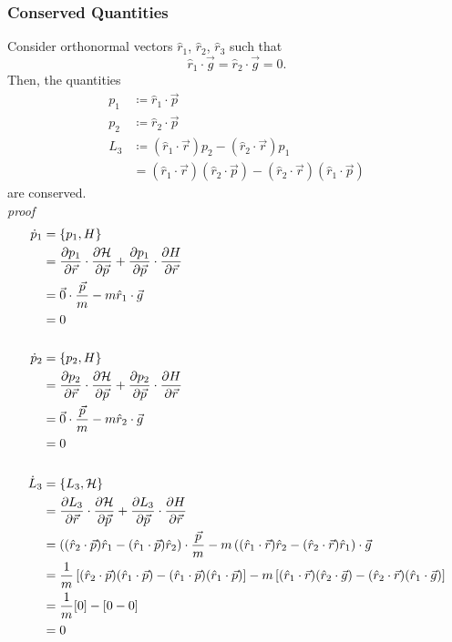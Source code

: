 \documentclass[12pt]{article}
\newcommand{\Ham}{\mathcal{H}}
\newcommand{\pos}{\vec{r}}
\newcommand{\mom}{\vec{p}}
\begin{document}
\subsubsection*{Conserved Quantities}
Consider orthonormal vectors $\hat{r}_1$, $\hat{r}_2$, $\hat{r}_3$ such that
\[ \hat{r}_1 \cdot \vec{g} = \hat{r}_2 \cdot \vec{g} = 0. \]
Then, the quantities
\begin{align*}
    p_1 &\coloneqq \hat{r}_1\cdot\mom \\
    p_2 &\coloneqq \hat{r}_2\cdot\mom \\
    L_3 &\coloneqq (\hat{r}_1\cdot\pos)p_2 - (\hat{r}_2\cdot{\pos})p_1 \\
    &= (\hat{r}_1 \cdot \pos)(\hat{r}_2 \cdot \mom) - (\hat{r}_2 \cdot \pos)(\hat{r}_1 \cdot \mom)
\end{align*}
are conserved. \\ \textit{proof}
\begin{align*}
    \dot{p}_1 &= \pb{p_1}{H} \\
    &= \pdv{p_1}{\pos}\cdot\pdv{\Ham}{\mom} + \pdv{p_1}{\mom}\cdot\pdv{H}{\pos} \\
    &= \vec{0}\cdot\frac{\mom}{m} - m\hat{r}_1\cdot\vec{g} \\
    &= 0 \\
    \\
    \dot{p}_2 &= \pb{p_2}{H} \\
    &= \pdv{p_2}{\pos}\cdot\pdv{\Ham}{\mom} + \pdv{p_2}{\mom}\cdot\pdv{H}{\pos} \\
    &= \vec{0}\cdot\frac{\mom}{m} - m\hat{r}_2\cdot\vec{g} \\
    &= 0 \\
    \\
    \dot{L}_3 &= \pb{L_3}{\Ham} \\
    &= \pdv{L_3}{\pos}\cdot\pdv{\Ham}{\mom} + \pdv{L_3}{\mom}\cdot\pdv{H}{\pos} \\
    &= \left((\hat{r}_2\cdot\mom)\hat{r}_1 - (\hat{r}_1\cdot\mom)\hat{r}_2\right)\cdot \frac{\mom}{m} - m\left((\hat{r}_1\cdot\pos)\hat{r}_2 - (\hat{r}_2\cdot\pos)\hat{r}_1\right)\cdot\vec{g} \\
    &= \frac{1}{m}\left[(\hat{r}_2\cdot\mom)(\hat{r}_1\cdot\mom) - (\hat{r}_1\cdot\mom)(\hat{r}_1\cdot\mom)\right] - m\left[(\hat{r}_1\cdot\pos)(\hat{r}_2\cdot\vec{g}) - (\hat{r}_2\cdot\pos)(\hat{r}_1\cdot\vec{g})\right] \\
    &= \frac{1}{m}[0] - [0-0] \\
    &= 0
\end{align*}
\end{document}
